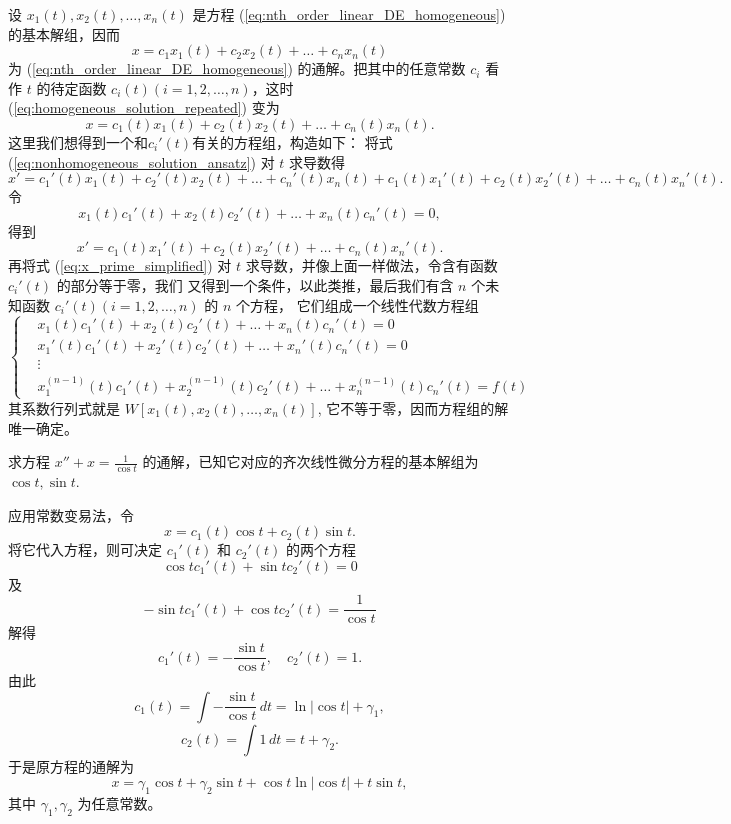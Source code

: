 \begin{example}[常数变易法解非齐次线性微分方程]\label{ex:常数变易法解非齐次线性微分方程}
    设 $x_1(t), x_2(t), \dots, x_n(t)$ 是方程 (\ref{eq:nth_order_linear_DE_homogeneous}) 的基本解组，因而
\begin{equation}
x=c_1x_1(t)+c_2x_2(t)+\dots+c_nx_n(t) \label{eq:homogeneous_solution_repeated}
\end{equation}
为 (\ref{eq:nth_order_linear_DE_homogeneous}) 的通解。把其中的任意常数 $c_i$ 看作 $t$ 的待定函数 $c_i(t) (i=1,2,\dots,n)$，这时
(\ref{eq:homogeneous_solution_repeated}) 变为
\begin{equation}
x=c_1(t)x_1(t)+c_2(t)x_2(t)+\dots+c_n(t)x_n(t). \label{eq:nonhomogeneous_solution_ansatz}
\end{equation}
这里我们想得到一个和$c_i'(t)$有关的方程组，构造如下：
将式 (\ref{eq:nonhomogeneous_solution_ansatz}) 对 $t$ 求导数得
$$x'=c_1'(t)x_1(t)+c_2'(t)x_2(t)+\dots+c_n'(t)x_n(t) + c_1(t)x_1'(t)+c_2(t)x_2'(t)+\dots+c_n(t)x_n'(t).$$
令
\begin{equation}
x_1(t)c_1'(t)+x_2(t)c_2'(t)+\dots+x_n(t)c_n'(t) = 0, \label{eq:condition_1}
\end{equation}
得到
\begin{equation}
x'=c_1(t)x_1'(t)+c_2(t)x_2'(t)+\dots+c_n(t)x_n'(t). \label{eq:x_prime_simplified}
\end{equation}
再将式 (\ref{eq:x_prime_simplified}) 对 $t$ 求导数，并像上面一样做法，令含有函数 $c_i'(t)$ 的部分等于零，我们
又得到一个条件，以此类推，最后我们有含 $n$ 个未知函数 $c_i'(t) (i=1,2,\dots,n)$ 的 $n$ 个方程，
它们组成一个线性代数方程组
\begin{equation}
\left\{
\begin{aligned}
&x_1(t)c_1'(t)+x_2(t)c_2'(t)+\dots+x_n(t)c_n'(t) = 0 \\
&x_1'(t)c_1'(t)+x_2'(t)c_2'(t)+\dots+x_n'(t)c_n'(t) = 0 \\
&\vdots \\
&x_1^{(n-1)}(t)c_1'(t)+x_2^{(n-1)}(t)c_2'(t)+\dots+x_n^{(n-1)}(t)c_n'(t) = f(t)
\end{aligned}
\right. \label{eq:system_of_equations_for_c_prime}
\end{equation}
其系数行列式就是 $W[x_1(t), x_2(t), \dots,
x_n(t)]$, 它不等于零，因而方程组的解唯一确定。

\end{example}

\begin{example}
    求方程 $x''+x=\frac{1}{\cos t}$ 的通解，已知它对应的齐次线性微分方程的基本解组为
$\cos t, \sin t$.
\end{example}
\begin{solution}
    应用常数变易法，令
$$x=c_1(t)\cos t+c_2(t)\sin t.$$
将它代入方程，则可决定 $c_1'(t)$ 和 $c_2'(t)$ 的两个方程
$$ \cos t c_1'(t) + \sin t c_2'(t) = 0 $$
及
$$ -\sin t c_1'(t) + \cos t c_2'(t) = \frac{1}{\cos t} $$
解得
$$c_1'(t) = -\frac{\sin t}{\cos t}, \quad c_2'(t) = 1.$$
由此
$$c_1(t) = \int -\frac{\sin t}{\cos t}\,dt = \ln |\cos t| + \gamma_1,$$
$$c_2(t) = \int 1\,dt = t+\gamma_2.$$
于是原方程的通解为
$$x=\gamma_1\cos t+\gamma_2\sin t+\cos t \ln |\cos t| + t\sin t,$$
其中 $\gamma_1, \gamma_2$ 为任意常数。
\end{solution}

